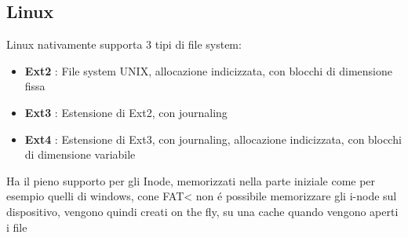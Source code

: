 \subsection{Linux}
Linux nativamente supporta 3 tipi di file system:
\begin{itemize}
    \item \textbf{Ext2} : File system UNIX, allocazione indicizzata, con blocchi di dimensione fissa
    \item \textbf{Ext3} : Estensione di Ext2, con journaling
    \item \textbf{Ext4} : Estensione di Ext3, con journaling, allocazione indicizzata, con blocchi di dimensione variabile
\end{itemize}
Ha il pieno supporto per gli Inode, memorizzati nella parte iniziale come per esempio quelli di windows, cone FAT< non é possibile memorizzare gli i-node sul dispositivo, vengono quindi creati
on the fly, su una cache quando vengono aperti i file



